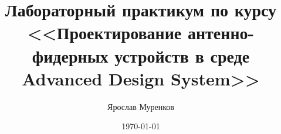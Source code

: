 \documentclass[a4paper,12pt]{report}
\author{Ярослав Муренков}
\title{Лабораторный практикум по курсу <<Проектирование антенно-фидерных устройств в среде Advanced Design System>>}
\date{\today}
\begin{document}
\tableofcontents{}




\end{document}
